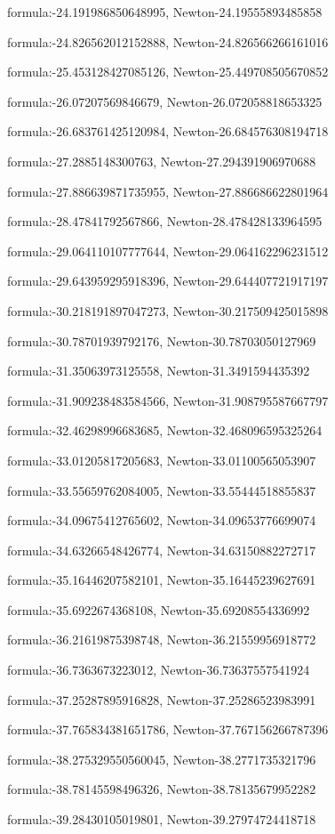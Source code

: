 \documentclass{article}
\begin{document}
formula:-24.191986850648995, Newton-24.19555893485858

formula:-24.826562012152888, Newton-24.826566266161016

formula:-25.453128427085126, Newton-25.449708505670852

formula:-26.07207569846679, Newton-26.072058818653325

formula:-26.683761425120984, Newton-26.684576308194718

formula:-27.2885148300763, Newton-27.294391906970688

formula:-27.886639871735955, Newton-27.886686622801964

formula:-28.47841792567866, Newton-28.478428133964595

formula:-29.064110107777644, Newton-29.064162296231512

formula:-29.643959295918396, Newton-29.644407721917197

formula:-30.218191897047273, Newton-30.217509425015898

formula:-30.78701939792176, Newton-30.78703050127969

formula:-31.35063973125558, Newton-31.3491594435392

formula:-31.909238483584566, Newton-31.908795587667797

formula:-32.46298996683685, Newton-32.468096595325264

formula:-33.01205817205683, Newton-33.01100565053907

formula:-33.55659762084005, Newton-33.55444518855837

formula:-34.09675412765602, Newton-34.09653776699074

formula:-34.63266548426774, Newton-34.63150882272717

formula:-35.16446207582101, Newton-35.16445239627691

formula:-35.6922674368108, Newton-35.69208554336992

formula:-36.21619875398748, Newton-36.21559956918772

formula:-36.7363673223012, Newton-36.73637557541924

formula:-37.25287895916828, Newton-37.25286523983991

formula:-37.765834381651786, Newton-37.767156266787396

formula:-38.275329550560045, Newton-38.2771735321796

formula:-38.78145598496326, Newton-38.78135679952282

formula:-39.28430105019801, Newton-39.27974724418718
\end{document}
